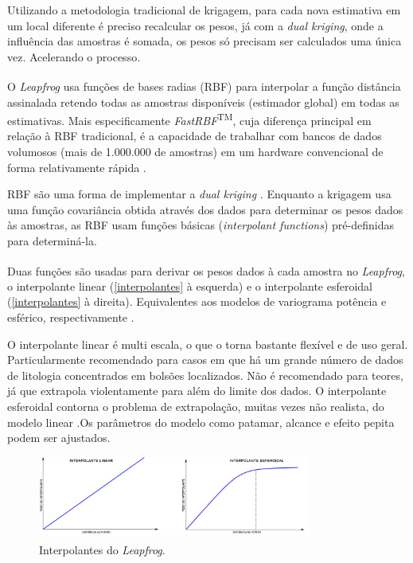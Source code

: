 Utilizando a metodologia tradicional de krigagem, para cada nova estimativa em um local diferente é preciso recalcular os pesos, já com a \textit{dual kriging}, onde a influência das amostras é somada, os pesos só precisam ser calculados uma única vez. Acelerando o processo.

O \textit{Leapfrog}\textsuperscript{\textregistered} usa funções de bases radias (RBF) para interpolar a função distância assinalada retendo todas as amostras disponíveis (estimador global) em todas as estimativas. Mais especificamente \textit{FastRBF}\textsuperscript{TM}, cuja diferença principal em relação à RBF tradicional, é a capacidade de trabalhar com bancos de dados volumosos (mais de 1.000.000 de amostras) em um hardware convencional de forma relativamente rápida \cite{leapfrogfastrbf}. 

RBF são uma forma de implementar a \textit{dual kriging} \cite{leapfrogpredictions}. Enquanto a krigagem usa uma função covariância obtida através dos dados para determinar os pesos dados às amostras, as RBF usam funções básicas (\textit{interpolant functions}) pré-definidas para determiná-la.

Duas funções são usadas para derivar os pesos dados à cada amostra no \textit{Leapfrog}\textsuperscript{\textregistered}, o interpolante linear (\autoref{interpolantes} à esquerda) e o interpolante esferoidal (\autoref{interpolantes} à direita). Equivalentes aos modelos de variograma potência e esférico, respectivamente .

O interpolante linear é multi escala, o que o torna bastante flexível e de uso geral. Particularmente recomendado para casos em que há um grande número de dados de litologia concentrados em bolsões localizados. Não é recomendado para teores, já que extrapola violentamente para além do limite dos dados. O interpolante esferoidal contorna o problema de extrapolação, muitas vezes não realista, do modelo linear \cite{leapfroginterpolant}.Os parâmetros do modelo como patamar, alcance e efeito pepita podem ser ajustados.

\begin{figure}[!htb]
	\caption{\label{interpolantes}Interpolantes do \textit{Leapfrog}\textsuperscript{\textregistered}.}
	\begin{center}
		\includegraphics[width=0.8\textwidth]{revisao_bibliografica/interpolantes}
	\end{center}
\end{figure}

